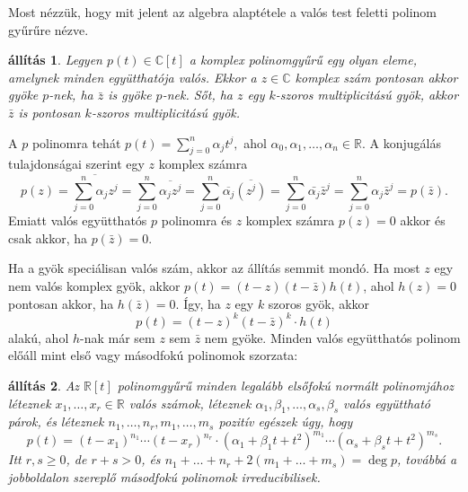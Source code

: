\documentclass[9pt, showtrims]{memoir}
\makeatletter
\renewenvironment{proof}[1][\proofname]
    {\par\pushQED{\qed}%
    \normalfont \topsep6\p@\@plus6\p@\relax
    \trivlist
    \item[\hskip\labelsep
        \itshape
    #1\@addpunct{:}]\ignorespaces}
    {\popQED\endtrivlist\@endpefalse}
\theoremstyle{plain}
\newtheorem{proposition}{állítás}[section]
\theoremstyle{remark}
\theoremstyle{definition}
\makeatother
\begin{document}
Most nézzük, hogy mit jelent az algebra alaptétele a valós test feletti polinom gyűrűre nézve.
\begin{proposition}
    Legyen $p\left( t \right)\in\mathbb{C}[t]$ a komplex polinomgyűrű egy olyan eleme, 
    amelynek minden együtthatója valós.
    Ekkor a $z\in \mathbb{C}$ komplex szám pontosan akkor gyöke $p$-nek, 
    ha $\bar{z}$ is gyöke $p$-nek.
    Sőt, ha $z$ egy $k$-szoros multiplicitású gyök, 
    akkor $\bar{z}$ is pontosan $k$-szoros multiplicitású gyök.
\end{proposition}
\begin{proof}
    A $p$ polinomra tehát 
    \begin{math}
        p\left( t \right)
        =
        \sum_{j=0}^n\alpha_jt^j,
    \end{math}
    ahol $\alpha_0,\alpha_1,\dots,\alpha_n\in\mathbb{R}$.
    A konjugálás tulajdonságai szerint egy $z$ komplex számra
    \[
        p\left( z \right)=
        \overline{
            \sum_{j=0}^n\alpha_jz^j
        }
        =
        \sum_{j=0}^n\overline{\alpha_jz^j}
        =
        \sum_{j=0}^n\overline{\alpha_j}\overline{(z^j)}
        =
        \sum_{j=0}^n\bar{\alpha_j}\bar{z}^j
        =
        \sum_{j=0}^n\alpha_j\bar{z}^j
        =
        p\left(\bar{z} \right).
    \]
    Emiatt valós együtthatós $p$ polinomra és $z$ komplex számra 
    $p\left( z \right)=0$ akkor és csak akkor, ha $p\left( \bar{z} \right)=0.$

    Ha a gyök speciálisan valós szám, akkor az állítás semmit mondó.
    Ha most $z$ egy nem valós komplex gyök,
    akkor $p(t)=\left( t-z \right)\left( t-\bar{z} \right)h\left( t \right)$, ahol 
    $h\left( z \right)=0$ pontosan akkor, ha $h\left( \bar{z} \right)=0$.
    Így, ha $z$ egy $k$ szoros gyök,
    akkor
    \[
        p\left( t \right)=\left( t-z \right)^{k}\left( t-\bar{z} \right)^{k}\cdot h\left( t \right)
    \]
    alakú, ahol $h$-nak már sem $z$ sem $\bar{z}$ nem gyöke.
\end{proof}
Minden valós együtthatós polinom előáll mint első vagy másodfokú polinomok szorzata:
\begin{proposition}\label{pr:RealPolFact}
    Az $\mathbb{R}[t]$ polinomgyűrű minden legalább elsőfokú normált polinomjához
    léteznek $x_1,\dots,x_r\in\mathbb{R}$ valós számok,
léteznek $\alpha_1,\beta_1,\dots,\alpha_s,\beta_s$ valós együttható párok, 
    és léteznek
    $n_1,\dots,n_r, m_1,\dots,m_s$ pozitív egészek úgy, hogy
    \[
        p\left( t \right)
        =
        \left( t-x_1 \right)^{n_1}
        \cdots
        \left( t-x_r \right)^{n_r}
        \cdot
        \left(\alpha_1 + \beta_1t +t^2\right)^{m_1}
        \cdots
        \left(\alpha_s + \beta_st +t^2\right)^{m_s}.
    \]
    Itt $r,s\geq 0$, de $r+s>0$, és $n_1+\dots+n_r+2\left( m_1+\dots+m_s \right)=\deg p$, 
    továbbá a jobboldalon szereplő másodfokú polinomok irreducibilisek.
\end{proposition}
\end{document}
